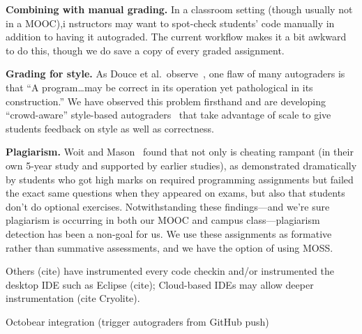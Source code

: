 \textbf{Combining with manual grading.}  In a classroom setting (though
usually not in a MOOC),i nstructors may want to
spot-check students' code manually  in addition to having it
autograded.  The current workflow makes it a  bit awkward to do this,
though we do save a copy of every graded assignment.

\textbf{Grading for style.}
As Douce et al.\ observe~\cite{douce-2005-autograding-survey}, one flaw
of many autograders is that ``A program\ldots{}may be correct in its
operation yet pathological in its construction.''
We have observed this problem firsthand and are developing
``crowd-aware'' style-based
autograders~\cite{autostyle,clustering-style} that take advantage of
scale to give students feedback on style as well as correctness.  

\textbf{Plagiarism.}
Woit and Mason~\cite{woit2003} found that not only is cheating rampant
(in their own 5-year study and supported by earlier studies), as
demonstrated dramatically by students who got high marks on required
programming assignments but failed the exact same questions when they
appeared on exams, but also that students don't do optional exercises.
Notwithstanding these findings---and we're sure plagiarism is occurring
in both our MOOC and campus class---plagiarism detection has been a
non-goal for us.  We use these assignments as formative rather than
summative assessments, and we have the option of using
MOSS.

Others (cite) have instrumented every code checkin and/or instrumented the desktop IDE  such as Eclipse (cite); Cloud-based IDEs may allow deeper instrumentation (cite Cryolite).

Octobear integration (trigger autograders from GitHub push)
